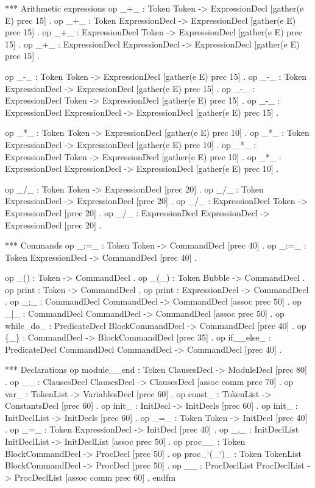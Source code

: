 \documentclass{llncs}%
\begin{document}
 *** Arithmetic expressions
 op _+_ : Token Token -> ExpressionDecl [gather(e E) prec 15] .
 op _+_ : Token ExpressionDecl -> ExpressionDecl [gather(e E) prec 15] .
 op _+_ : ExpressionDecl Token -> ExpressionDecl [gather(e E) prec 15] .
 op _+_ : ExpressionDecl ExpressionDecl -> ExpressionDecl 
          [gather(e E) prec 15] .

 op _-_ : Token Token -> ExpressionDecl  [gather(e E) prec 15] .
 op _-_ : Token ExpressionDecl -> ExpressionDecl [gather(e E) prec 15] .
 op _-_ : ExpressionDecl Token -> ExpressionDecl [gather(e E) prec 15] .
 op _-_ : ExpressionDecl ExpressionDecl -> ExpressionDecl 
          [gather(e E) prec 15] .

 op _*_ : Token Token -> ExpressionDecl [gather(e E) prec 10] .
 op _*_ : Token ExpressionDecl -> ExpressionDecl [gather(e E) prec 10] .
 op _*_ : ExpressionDecl Token -> ExpressionDecl [gather(e E) prec 10] .
 op _*_ : ExpressionDecl ExpressionDecl -> ExpressionDecl 
          [gather(e E) prec 10] .

 op _/_ : Token Token -> ExpressionDecl [prec 20] .
 op _/_ : Token ExpressionDecl -> ExpressionDecl [prec 20] .
 op _/_ : ExpressionDecl Token -> ExpressionDecl [prec 20] .
 op _/_ : ExpressionDecl ExpressionDecl -> ExpressionDecl [prec 20] .

 *** Commands
 op _:=_ : Token Token -> CommandDecl [prec 40] .
 op _:=_ : Token ExpressionDecl -> CommandDecl [prec 40] .

 op _() : Token -> CommandDecl .
 op _(_) : Token Bubble -> CommandDecl .
 op print : Token -> CommandDecl .
 op print : ExpressionDecl -> CommandDecl .
 op _;_ : CommandDecl CommandDecl -> CommandDecl [assoc prec 50] .
 op _|_ : CommandDecl CommandDecl -> CommandDecl [assoc prec 50] .
 op while_do_ : PredicateDecl BlockCommandDecl -> CommandDecl [prec 40] .
 op \{_\} : CommandDecl -> BlockCommandDecl [prec 35] .
 op if__else_ : PredicateDecl CommandDecl CommandDecl -> CommandDecl 
    [prec 40] .

 *** Declarations
 op module__end : Token ClausesDecl -> ModuleDecl [prec 80] .
 op __ : ClausesDecl ClausesDecl -> ClausesDecl [assoc comm prec 70] .
 op var_ : TokenList -> VariablesDecl [prec 60] .
 op const_ : TokenList -> ConstantsDecl [prec 60] .
 op init_ : InitDecl -> InitDecls [prec 60] .
 op init_ : InitDeclList -> InitDecls  [prec 60] .
 op _=_ : Token Token -> InitDecl  [prec 40] .
 op _=_ : Token ExpressionDecl -> InitDecl  [prec 40] .
 op _,_ : InitDeclList InitDeclList -> InitDeclList  [assoc prec 50] .
 op proc__ : Token BlockCommandDecl -> ProcDecl [prec 50] .
 op proc_`(_`)_ : Token TokenList BlockCommandDecl -> ProcDecl  
    [prec 50] .
 op __ : ProcDeclList ProcDeclList -> ProcDeclList  
   [assoc comm prec 60] .
endfm 
\nwendcode{}\nwdocspar
\end{document}
